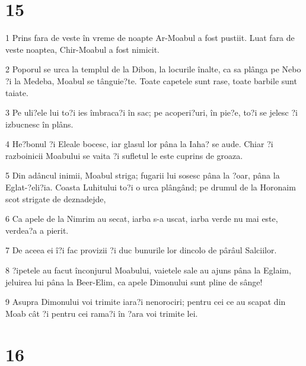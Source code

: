\chapter{15}

\par 1 Prins fara de veste în vreme de noapte Ar-Moabul a fost pustiit. Luat fara de veste noaptea, Chir-Moabul a fost nimicit.
\par 2 Poporul se urca la templul de la Dibon, la locurile înalte, ca sa plânga pe Nebo ?i la Medeba, Moabul se tânguie?te. Toate capetele sunt rase, toate barbile sunt taiate.
\par 3 Pe uli?ele lui to?i ies îmbraca?i în sac; pe acoperi?uri, în pie?e, to?i se jelesc ?i izbucnesc în plâns.
\par 4 He?bonul ?i Eleale bocesc, iar glasul lor pâna la Iaha? se aude. Chiar ?i razboinicii Moabului se vaita ?i sufletul le este cuprins de groaza.
\par 5 Din adâncul inimii, Moabul striga; fugarii lui sosesc pâna la ?oar, pâna la Eglat-?eli?ia. Coasta Luhitului to?i o urca plângând; pe drumul de la Horonaim scot strigate de deznadejde,
\par 6 Ca apele de la Nimrim au secat, iarba s-a uscat, iarba verde nu mai este, verdea?a a pierit.
\par 7 De aceea ei î?i fac provizii ?i duc bunurile lor dincolo de pârâul Salciilor.
\par 8 ?ipetele au facut înconjurul Moabului, vaietele sale au ajuns pâna la Eglaim, jeluirea lui pâna la Beer-Elim, ca apele Dimonului sunt pline de sânge!
\par 9 Asupra Dimonului voi trimite iara?i nenorociri; pentru cei ce au scapat din Moab cât ?i pentru cei rama?i în ?ara voi trimite lei.

\chapter{16}

